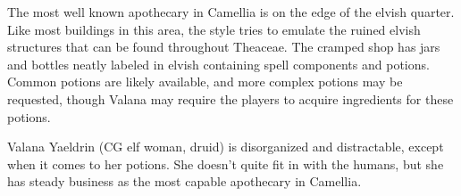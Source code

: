The most well known apothecary in Camellia is on the edge of the elvish quarter.
Like most buildings in this area, the style tries to emulate the ruined elvish structures that can be found throughout Theaceae.
The cramped shop has jars and bottles neatly labeled in elvish containing spell components and potions.
Common potions are likely available, and more complex potions may be requested, though Valana may require the players to acquire ingredients for these potions.

Valana Yaeldrin (CG elf woman, druid) is disorganized and distractable, except when it comes to her potions.
She doesn't quite fit in with the humans, but she has steady business as the most capable apothecary in Camellia.
